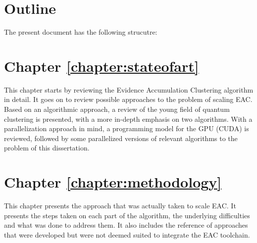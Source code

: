 


\section{Outline}

The present document has the following strucutre:

\section*{Chapter \ref{chapter:stateofart}}

This chapter starts by reviewing the Evidence Accumulation Clustering algorithm in detail.
It goes on to review possible approaches to the problem of scaling EAC.
Based on an algorithmic approach, a review of the young field of quantum clustering is presented, with a more in-depth emphasis on two algorithms.
With a parallelization approach in mind, a programming model for the GPU (CUDA) is reviewed, followed by some parallelized versions of relevant algorithms to the problem of this dissertation.

\section*{Chapter \ref{chapter:methodology}}

This chapter presents the approach that was actually taken to scale EAC.
It presents the steps taken on each part of the algorithm, the underlying difficulties and what was done to address them.
It also includes the reference of approaches that were developed but were not deemed suited to integrate the EAC toolchain.

